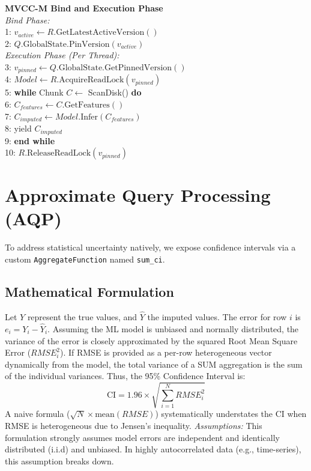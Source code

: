 \documentclass[conference]{IEEEtran}
\begin{document}
\vspace{0.5em}
\noindent\textbf{MVCC-M Bind and Execution Phase} \\
\textit{Bind Phase:} \\
1: $v_{active} \gets R.\text{GetLatestActiveVersion}()$ \\
2: $Q.\text{GlobalState}.\text{PinVersion}(v_{active})$ \\
\textit{Execution Phase (Per Thread):} \\
3: $v_{pinned} \gets Q.\text{GlobalState}.\text{GetPinnedVersion}()$ \\
4: $Model \gets R.\text{AcquireReadLock}(v_{pinned})$ \\
5: \textbf{while} Chunk $C \gets$ ScanDisk() \textbf{do} \\
6: \quad $C_{features} \gets C.\text{GetFeatures}()$ \\
7: \quad $C_{imputed} \gets Model.\text{Infer}(C_{features})$ \\
8: \quad yield $C_{imputed}$ \\
9: \textbf{end while} \\
10: $R.\text{ReleaseReadLock}(v_{pinned})$
\vspace{0.5em}

\section{Approximate Query Processing (AQP)}

To address statistical uncertainty natively, we expose confidence intervals via a custom \texttt{AggregateFunction} named \texttt{sum\_ci}. 

\subsection{Mathematical Formulation}
Let $Y$ represent the true values, and $\hat{Y}$ the imputed values. The error for row $i$ is $e_i = Y_i - \hat{Y}_i$. Assuming the ML model is unbiased and normally distributed, the variance of the error is closely approximated by the squared Root Mean Square Error ($RMSE_i^2$). 
If RMSE is provided as a per-row heterogeneous vector dynamically from the model, the total variance of a SUM aggregation is the sum of the individual variances. Thus, the 95\% Confidence Interval is:
\begin{equation}
\text{CI} = 1.96 \times \sqrt{\sum_{i=1}^{N} RMSE_i^2}
\end{equation}
A naive formula ($\sqrt{N} \times \text{mean}(RMSE)$) systematically understates the CI when RMSE is heterogeneous due to Jensen's inequality. 
\textit{Assumptions:} This formulation strongly assumes model errors are independent and identically distributed (i.i.d) and unbiased. In highly autocorrelated data (e.g., time-series), this assumption breaks down. 
\end{document}
